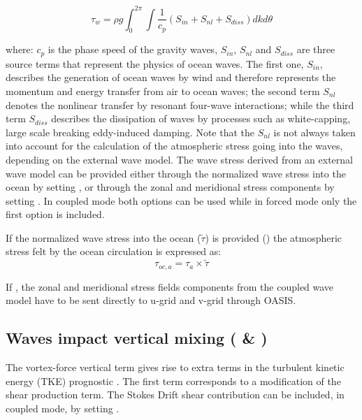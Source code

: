 \documentclass[../main/NEMO_manual]{subfiles}
\begin{document}
\[
  \tau_w = \rho g \int_{0}^{2\pi} \int {\frac{1}{c_p} (S_{in}+S_{nl}+S_{diss})}dkd\theta
\]


where: $c_p$ is the phase speed of the gravity waves,
$S_{in}$, $S_{nl}$ and $S_{diss}$ are three source terms that represent
the physics of ocean waves. The first one, $S_{in}$, describes the generation of ocean waves by wind and therefore represents the momentum and energy transfer from air to ocean waves; the second term $S_{nl}$ denotes
the nonlinear transfer by resonant four-wave interactions; while the third term $S_{diss}$ describes the dissipation of waves by processes such as white-capping, large scale breaking eddy-induced damping. Note that the $S_{nl}$ is not always taken into account for the calculation of the atmospheric stress going into the waves, depending on the external wave model.
The wave stress derived from an external wave model can be provided either through the normalized wave stress into the ocean by setting , or through the zonal and meridional stress components by setting
  .  In coupled mode both options can be used while in forced mode only the first option is included.
 
If the normalized wave stress into the ocean ($\widetilde{\tau}$) is provided () the atmospheric stress felt by the ocean circulation is expressed as:
\[
  \tau_{oc,a} = \tau_a \times \widetilde{\tau}
\]

If   , the zonal and meridional stress fields components from the coupled wave model have to be sent directly to u-grid and v-grid through OASIS.



\subsection[Waves impact vertical mixing  (\forcode{ln_phioc} \& \forcode{ln_stshear})]{Waves impact vertical mixing (\protect{} \& \protect{})}
\label{subsec:SBC_wave_TKE}


The vortex-force vertical term gives rise to extra terms in the turbulent kinetic energy (TKE) prognostic \citep{couvelard_2020}. The first term corresponds to a modification of the shear production term. 
The Stokes Drift shear contribution can be included, in coupled mode, by setting .
\end{document}
